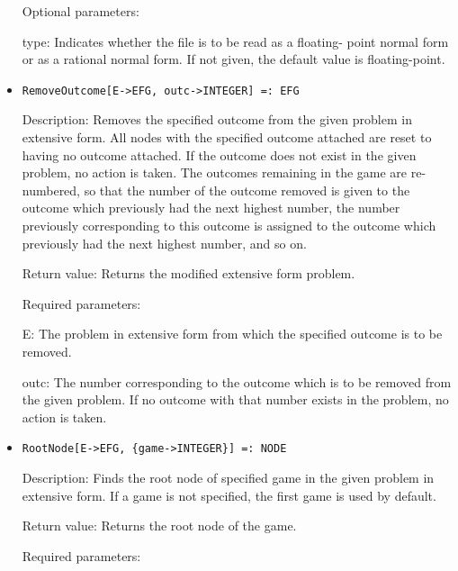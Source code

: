 \begin{itemize}
\item
[Optional parameters:]\hfil\null
	

\bd
\item
[type:] Indicates whether the file is to be read as a floating- point
normal form or as a rational normal form.  If not given, the default
value is floating-point.
\ed
\ed

\item

\protect \large \begin{verbatim}
RemoveOutcome[E->EFG, outc->INTEGER] =: EFG
\end{verbatim}\normalsize

\bd
\item
[Description:] Removes the specified outcome from the given problem in
extensive form.  All nodes with the specified outcome attached are
reset to having no outcome attached.  If the outcome does not exist in
the given problem, no action is taken.  The outcomes remaining in the
game are re-numbered, so that the number of the outcome removed is
given to the outcome which previously had the next highest number, the
number previously corresponding to this outcome is assigned to the
outcome which previously had the next highest number, and so on.
\item  
[Return value:] Returns the modified extensive form problem.
\item
[Required parameters:]\hfil\null
	
\bd
\item
[E:] The problem in extensive form from which the specified outcome is
to be removed.
\item
[outc:] The number corresponding to the outcome which is to be removed
from the given problem.  If no outcome with that number exists in the
problem, no action is taken.
\ed
\ed

\item
\protect \large \begin{verbatim}
RootNode[E->EFG, {game->INTEGER}] =: NODE
\end{verbatim}\normalsize

\bd
\item
[Description:] Finds the root node of specified game in the given
problem in extensive form.  If a game is not specified, the first game
is used by default.
\item
[Return value:] Returns the root node of the game.
\item
[Required parameters:]\hfil\null
	

\end{itemize}

